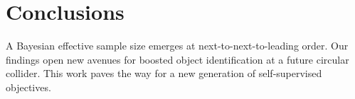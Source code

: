\section{Conclusions}\label{sec:conclusions}

A Bayesian effective sample size emerges at next-to-next-to-leading
order. Our findings open new avenues for boosted object identification
at a future circular collider. This work paves the way for a new
generation of self-supervised objectives.


